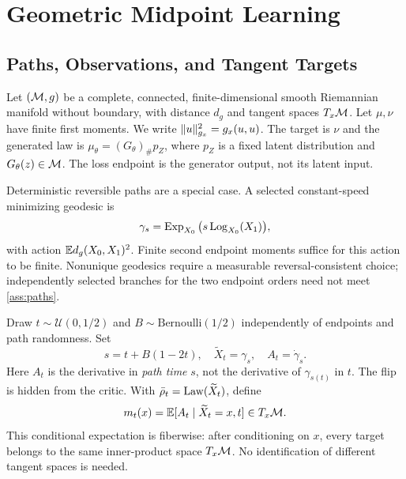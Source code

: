 \section{Geometric Midpoint Learning}
\label{sec:method}
\subsection{Paths, Observations, and Tangent Targets}
Let $(\M,g)$ be a complete, connected, finite-dimensional smooth Riemannian manifold without boundary, with distance $d_g$ and tangent spaces $T_x\M$. Let $\mu,\nu$ have finite first moments. We write $\norm{g_x}{u}^2=g_x(u,u)$. The target is $\nu$ and the generated law is $\mu_\theta=(G_\theta)_\#p_Z$, where $p_Z$ is a fixed latent distribution and $G_\theta(z)\in\M$. The loss endpoint is the generator output, not its latent input.


Deterministic reversible paths are a special case. A selected constant-speed minimizing geodesic is
\begin{equation}
\gamma_s=\Exp_{X_0}\big(s\Log_{X_0}(X_1)\big),
\label{eq:geodesic}
\end{equation}
with action $\E d_g(X_0,X_1)^2$. Finite second endpoint moments suffice for this action to be finite. Nonunique geodesics require a measurable reversal-consistent choice; independently selected branches for the two endpoint orders need not meet \cref{ass:paths}.

Draw $t\sim\mathcal U(0,1/2)$ and $B\sim\mathrm{Bernoulli}(1/2)$ independently of endpoints and path randomness. Set
\begin{equation}
s=t+B(1-2t),\quad \widetilde X_t=\gamma_s,\quad A_t=\dot\gamma_s.
\label{eq:flip}
\end{equation}
Here $A_t$ is the derivative in \emph{path time} $s$, not the derivative of $\gamma_{s(t)}$ in $t$. The flip is hidden from the critic. With $\bar\rho_t=\Law(\widetilde X_t)$, define
\begin{equation}
m_t(x)=\E[A_t\mid \widetilde X_t=x,t]\in T_x\M.
\label{eq:conditional}
\end{equation}
This conditional expectation is fiberwise: after conditioning on $x$, every target belongs to the same inner-product space $T_x\M$. No identification of different tangent spaces is needed.

